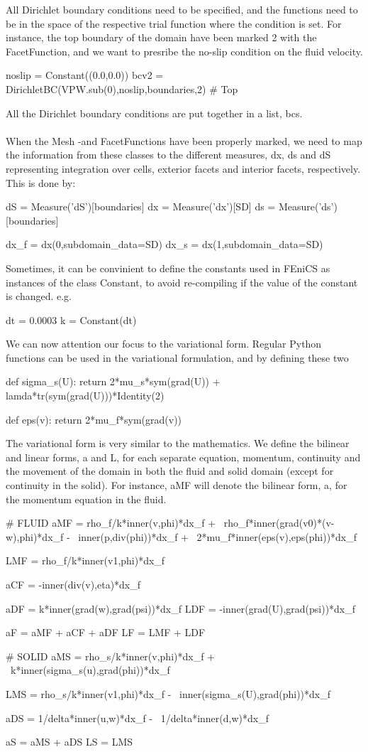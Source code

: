 All Dirichlet boundary conditions need to be specified, and the functions need to be in the space of the respective trial function where the condition is set. For instance, the top boundary of the domain have been marked 2 with the FacetFunction, and we want to presribe the no-slip condition on the fluid velocity.
\begin{cverbatim}
noslip = Constant((0.0,0.0))
bcv2 = DirichletBC(VPW.sub(0),noslip,boundaries,2) # Top
\end{cverbatim}
All the Dirichlet boundary conditions are put together in a list, bcs.\\ \\
When the Mesh -and FacetFunctions have been properly marked, we need to map the information from these classes to the different measures, dx, ds and dS representing integration over cells, exterior facets and interior facets, respectively. This is done by:
\begin{cverbatim}
dS = Measure('dS')[boundaries]
dx = Measure('dx')[SD]
ds = Measure('ds')[boundaries]

dx_f = dx(0,subdomain_data=SD)
dx_s = dx(1,subdomain_data=SD)
\end{cverbatim}
Sometimes, it can be convinient to define the constants used in FEniCS as instances of the class Constant, to avoid re-compiling if the value of the constant is changed. e.g.
\begin{cverbatim}
dt = 0.0003
k = Constant(dt)
\end{cverbatim}
We can now attention our focus to the variational form. Regular Python functions can be used in the variational formulation, and by defining these two
\begin{cverbatim}
def sigma_s(U):
	return 2*mu_s*sym(grad(U)) + lamda*tr(sym(grad(U)))*Identity(2)

def eps(v):
	return 2*mu_f*sym(grad(v))
\end{cverbatim}
The variational form is very similar to the mathematics. We define the bilinear and linear forms, a and L, for each separate equation, momentum, continuity and the movement of the domain in both the fluid and solid domain (except for continuity in the solid). For instance, aMF will denote the bilinear form, a, for the momentum equation in the fluid.
\begin{cverbatim}
# FLUID
aMF = rho_f/k*inner(v,phi)*dx_f + \
	rho_f*inner(grad(v0)*(v-w),phi)*dx_f - \
	 inner(p,div(phi))*dx_f + \
	2*mu_f*inner(eps(v),eps(phi))*dx_f

LMF = rho_f/k*inner(v1,phi)*dx_f

aCF = -inner(div(v),eta)*dx_f

aDF = k*inner(grad(w),grad(psi))*dx_f
LDF = -inner(grad(U),grad(psi))*dx_f

aF = aMF + aCF + aDF
LF = LMF + LDF

# SOLID
aMS = rho_s/k*inner(v,phi)*dx_f + \
	k*inner(sigma_s(u),grad(phi))*dx_f

LMS = rho_s/k*inner(v1,phi)*dx_f - \
	inner(sigma_s(U),grad(phi))*dx_f

aDS = 1/delta*inner(u,w)*dx_f - \
	1/delta*inner(d,w)*dx_f


aS = aMS + aDS
LS = LMS

\end{cverbatim}
